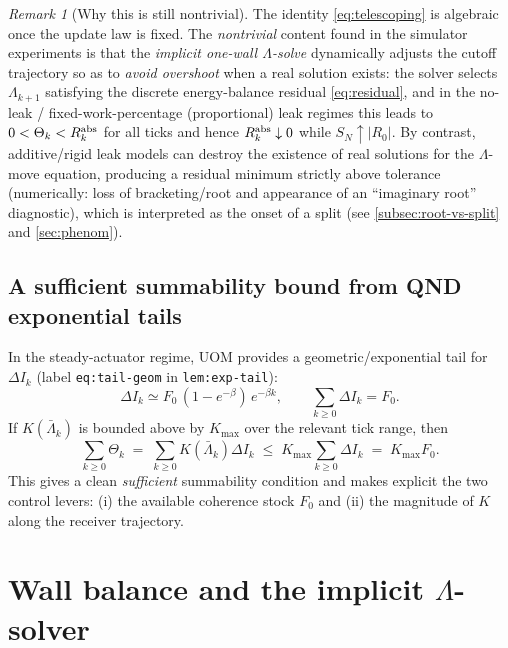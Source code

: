 \documentclass[11pt]{article}
\theoremstyle{definition}
\theoremstyle{plain}
\theoremstyle{remark}
\newtheorem{remark}[definition]{Remark}
\newcommand{\abs}[1]{\left\lvert #1\right\rvert}
\begin{document}
\begin{remark}[Why this is still nontrivial]
The identity \eqref{eq:telescoping} is algebraic once the update law is fixed. The \emph{nontrivial} content found in the
simulator experiments is that the \emph{implicit one-wall $\Lambda$-solve} dynamically adjusts the cutoff trajectory so as
to \emph{avoid overshoot} when a real solution exists: the solver selects $\Lambda_{k+1}$ satisfying the discrete
energy-balance residual \eqref{eq:residual}, and in the no-leak / fixed-work-percentage (proportional) leak regimes this
leads to
$0<\Theta_k<R^{\rm abs}_k$ for all ticks and hence $R^{\rm abs}_k\downarrow 0$ while $S_N\uparrow \abs{R_0}$.
By contrast, additive/rigid leak models can destroy the existence of real solutions for the $\Lambda$-move equation,
producing a residual minimum strictly above tolerance (numerically: loss of bracketing/root and appearance of an
``imaginary root'' diagnostic), which is interpreted as the onset of a split (see \cref{subsec:root-vs-split} and
\cref{sec:phenom}).
\end{remark}

\subsection{A sufficient summability bound from QND exponential tails}
\label{subsec:summability-bound}

In the steady-actuator regime, UOM provides a geometric/exponential tail for $\Delta I_k$ (label \texttt{eq:tail-geom} in
\texttt{lem:exp-tail}):
\begin{equation}
\Delta I_k \simeq F_0\,(1-e^{-\beta})\,e^{-\beta k},
\qquad \sum_{k\ge 0}\Delta I_k = F_0.
\label{eq:deltaI-summable}
\end{equation}
If $K(\bar\Lambda_k)$ is bounded above by $K_{\max}$ over the relevant tick range, then
\begin{equation}
\sum_{k\ge 0}\Theta_k
\;=\;\sum_{k\ge 0}K(\bar\Lambda_k)\Delta I_k
\;\le\;K_{\max}\sum_{k\ge 0}\Delta I_k
\;=\;K_{\max}F_0.
\label{eq:theta-summable-bound}
\end{equation}
This gives a clean \emph{sufficient} summability condition and makes explicit the two control levers: (i) the available
coherence stock $F_0$ and (ii) the magnitude of $K$ along the receiver trajectory.

\section{Wall balance and the implicit $\Lambda$-solver}
\label{sec:lambda-solver}
\end{document}
